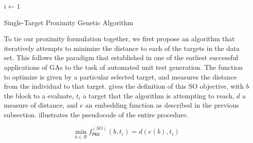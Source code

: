 \begin{algorithm}[t]

	\BlankLine
	\DontPrintSemicolon
	\;
	$i \leftarrow 1$\;
	\Return {}\;
	\caption{Single-Target Proximity Genetic Algorithm}
	\label{alg:stpga}
\end{algorithm}

To tie our proximity formulation together, we first propose an algorithm
that iteratively attempts to minimize the distance to
each of the targets in the data set.
This follows the paradigm that \citet{tonella2004evolutionary} established
in one of the earliest successful applications of \gls{GA}s
to the task of automated unit test generation.
The function to optimize is given by a particular selected
target, and measures the distance from the individual to that target.
 gives the definition of this \gls{SO}
objective, with $b$ the block to a evaluate, $t_i$ a target that the
algorithm is attempting to reach, $d$ a measure of distance,
and $e$ an embedding function as described in the previous
subsection.
 illustrates  the pseudocode of the entire procedure.

\begin{equation}
\min_{b \in \mathcal{B}} f^{(SO)}_{\texttt{PRO}}(b, t_i) = d(e(b), t_i)
\label{eq:proximity_so}
\end{equation}

